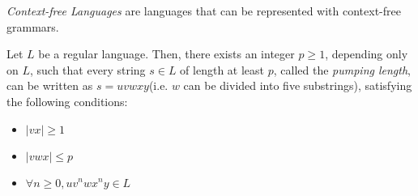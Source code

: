 \documentclass{report}
\begin{document}
			\begin{defn} \label{def_CFL}
				\emph{Context-free Languages} are languages that can be represented with context-free grammars.
			\end{defn}
			
			\begin{thm} \label{thm_pumping_lemma_CFL}
				Let $L$ be a regular language. Then, there exists an integer $p \ge 1$, depending only on $L$, such that every string $s \in L$ of length at least $p$, called the \emph{pumping length}, can be written as $s=uvwxy$(i.e. $w$ can be divided into five substrings), satisfying the following conditions:
				\begin{itemize}
					\item $|vx| \ge 1$
					\item $|vwx| \le p$
					\item $\forall n \ge 0, uv^nwx^ny \in L$
				\end{itemize}
			\end{thm}
\end{document}
